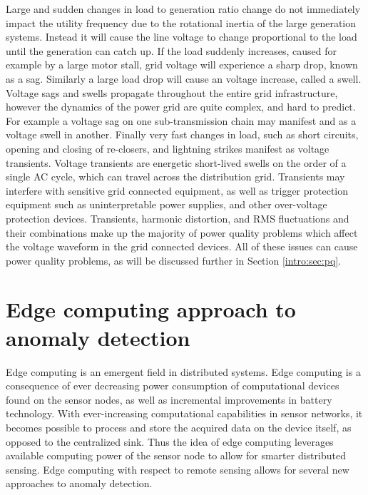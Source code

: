 Large and sudden changes in load to generation ratio change do not immediately impact the utility frequency due to the rotational inertia of the large generation systems.
Instead it will cause the line voltage to change proportional to the load until the generation can catch up.
If the load suddenly increases, caused for example by a large motor stall, grid voltage will experience a sharp drop, known as a sag.
Similarly a large load drop will cause an voltage increase, called a swell.
Voltage sags and swells propagate throughout the entire grid infrastructure, however the dynamics of the power grid are quite complex, and hard to predict.
For example a voltage sag on one sub-transmission chain may manifest and as a voltage swell in another.
Finally very fast changes in load, such as short circuits, opening and closing of re-closers, and lightning strikes manifest as voltage transients.
Voltage transients are energetic short-lived swells on the order of a single AC cycle, which can travel across the distribution grid.
Transients may interfere with sensitive grid connected equipment, as well as trigger protection equipment such as uninterpretable power supplies, and other over-voltage protection devices.
Transients, harmonic distortion, and RMS fluctuations and their combinations make up the majority of power quality problems which affect the voltage waveform in the grid connected devices. \cite{5154067} All of these issues can cause power quality problems, as will be discussed further in Section \ref{intro:sec:pq}.

\section{Edge computing approach to anomaly detection}\label{intro:edge}
Edge computing is an emergent field in distributed systems.
Edge computing is a consequence of ever decreasing power consumption of computational devices found on the sensor nodes, as well as incremental improvements in battery technology.
With ever-increasing computational capabilities in sensor networks, it becomes possible to process and store the acquired data on the device itself, as opposed to the centralized sink.
Thus the idea of edge computing leverages available computing power of the sensor node to allow for smarter distributed sensing.
Edge computing with respect to remote sensing allows for several new approaches to anomaly detection.


